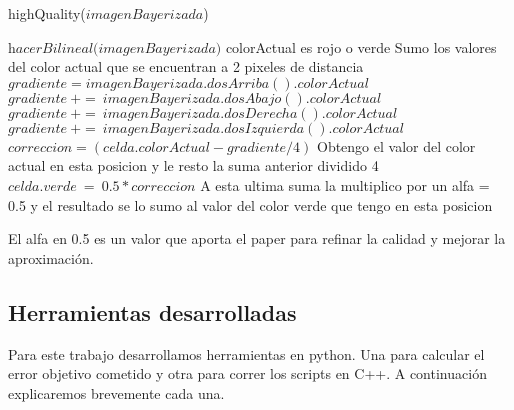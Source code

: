 \begin{algorithm}
\caption{highQuality($imagenBayerizada$)}\label{euclid}
\begin{algorithmic}[1]
\State $\textit{hacerBilineal(imagenBayerizada)}$
      	\Comment colorActual es rojo o verde
 \State \Comment Sumo los valores del color actual que se encuentran a 2 pixeles de distancia 
	 \State $gradiente = imagenBayerizada.dosArriba().colorActual$ 
	\State $gradiente\ +=\ imagenBayerizada.dosAbajo().colorActual$
	\State $gradiente\ +=\ imagenBayerizada.dosDerecha().colorActual$
	\State $gradiente\ +=\ imagenBayerizada.dosIzquierda().colorActual$
\State $correccion = (celda.colorActual - gradiente/4)$ \Comment Obtengo el valor del color actual en esta posicion y le resto la suma anterior dividido 4
\State $celda.verde\ =\ 0.5 * correccion$ \Comment  A esta ultima suma la multiplico por un alfa = 0.5 y el resultado se lo sumo al valor del color verde que tengo en esta posicion
      
  \EndIf
\EndFor
\end{algorithmic}
\end{algorithm}



El alfa en 0.5 es un valor que aporta el paper para refinar la calidad y mejorar la aproximación.
\clearpage
\subsection{Herramientas desarrolladas}

Para este trabajo desarrollamos herramientas en python. Una para calcular el error objetivo cometido y otra para correr los scripts en C++. A continuación explicaremos brevemente cada una.

